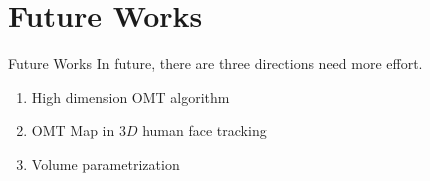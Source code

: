 \documentclass{beamer}
\theoremstyle{definition}
\begin{document}
\section{Future Works}
\begin{frame}{Future Works}
In future, there are three directions need more effort.

\begin{enumerate}

\item  High dimension OMT algorithm
\item  OMT Map in $3D$ human face tracking
\item  Volume parametrization
\end{enumerate}

\end{frame}





\end{document}
